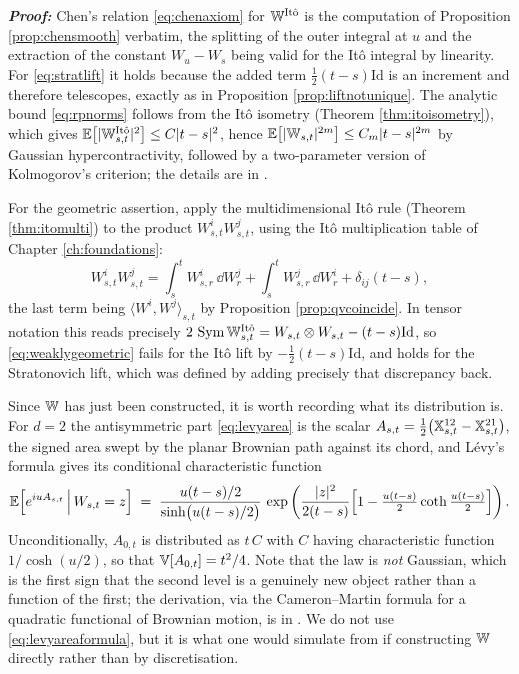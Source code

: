 \textbf{\textit{Proof:}} Chen's relation \eqref{eq:chenaxiom} for $\mathbb{W}^{\mathrm{It\hat o}}$ is the
computation of Proposition \ref{prop:chensmooth} verbatim, the splitting of the outer integral at
$u$ and the extraction of the constant $W_u - W_s$ being valid for the Itô integral by linearity.
For \eqref{eq:stratlift} it holds because the added term $\tfrac12(t-s)\mathrm{Id}$ is an increment
and therefore telescopes, exactly as in Proposition \ref{prop:liftnotunique}. The analytic bound
\eqref{eq:rpnorms} follows from the Itô isometry (Theorem \ref{thm:itoisometry}), which gives
$\mathbb{E}\bigl[|\mathbb{W}^{\mathrm{It\hat o}}_{s,t}|^2\bigr] \leq C|t-s|^2$, hence
$\mathbb{E}\bigl[|\mathbb{W}_{s,t}|^{2m}\bigr] \leq C_m |t-s|^{2m}$ by Gaussian hypercontractivity, followed by a
two-parameter version of Kolmogorov's criterion; the details are in \cite[Ch.\ 3]{frizhairer2020}.

For the geometric assertion, apply the multidimensional Itô rule (Theorem \ref{thm:itomulti}) to the
product $W^i_{s,t}W^j_{s,t}$, using the Itô multiplication table of Chapter \ref{ch:foundations}:
\[
W^i_{s,t}W^j_{s,t} = \int_s^t W^i_{s,r}\,\dd W^j_r + \int_s^t W^j_{s,r}\,\dd W^i_r + \delta_{ij}(t-s),
\]
the last term being $\langle W^i, W^j\rangle_{s,t}$ by Proposition \ref{prop:qvcoincide}. In tensor
notation this reads precisely  $2\,\operatorname{Sym}\mathbb{W}^{\mathrm{It\hat o}}_{s,t} = W_{s,t}\otimes W_{s,t} - (t-s)\mathrm{Id}$,
so \eqref{eq:weaklygeometric} fails for the Itô lift by $-\tfrac12(t-s)\mathrm{Id}$, and
holds for the Stratonovich lift, which was defined by adding precisely that discrepancy back.
\qedfilledtext

\medskip

\begin{remark}\label{rem:levyarealaw}
Since $\mathbb{W}$ has just been constructed, it is worth recording what its distribution is. For $d=2$
the antisymmetric part \eqref{eq:levyarea} is the scalar
$A_{s,t} = \tfrac12\bigl(\mathbb{X}^{12}_{s,t}-\mathbb{X}^{21}_{s,t}\bigr)$, the signed area swept by the planar
Brownian path against its chord, and Lévy's formula gives its conditional characteristic function
\begin{equation}\label{eq:levyareaformula}
\mathbb{E}\Bigl[e^{iuA_{s,t}} \,\Big|\, W_{s,t} = z\Bigr]
\;=\; \frac{u(t-s)/2}{\sinh\bigl(u(t-s)/2\bigr)}\,
\exp\left( \frac{|z|^2}{2(t-s)}\Bigl[1 - \tfrac{u(t-s)}{2}\coth\tfrac{u(t-s)}{2}\Bigr]\right).
\end{equation}
Unconditionally, $A_{0,t}$ is distributed as $t\,C$ with $C$ having characteristic
function $1/\cosh(u/2)$, so that $\mathbb{V}[A_{0,t}] = t^{2}/4$. Note that the law is \emph{not} Gaussian, which is the first sign that the
second level is a genuinely new object rather than a function of the first; the derivation, via the
Cameron--Martin formula for a quadratic functional of Brownian motion, is in
\cite[Ch.\ 13]{frizvictoir2010}. We do not use \eqref{eq:levyareaformula}, but it is what one would
simulate from if constructing $\mathbb{W}$ directly rather than by discretisation.
\end{remark}

